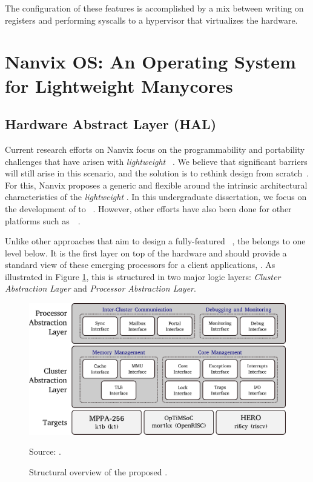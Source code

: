 	The configuration of these features is accomplished by a mix between
	writing on \dma registers and performing syscalls to a hypervisor
	that virtualizes the \mppa hardware.

\section{Nanvix OS: An Operating System for Lightweight Manycores}
\label{sec.nanvix}


	\subsection{Hardware Abstract Layer (HAL)}
	\label{sec.hal}

		Current research efforts on Nanvix focus on the programmability and portability
		challenges that have arisen with \textit{lightweight \manycores}~\cite{christgau2017, gamell2012, serres2011}.
		We believe that significant barriers will still arise in this scenario, and the solution is to rethink \os design from
		scratch~\cite{penna:compas19, penna2019}. For this, Nanvix proposes a generic and flexible \hal around the
		intrinsic architectural characteristics of the \textit{lightweight \manycores}. In this undergraduate dissertation, we 
		focus on the development of \hal to \mppa~\cite{DeDinechin2013-1}. However, other efforts have also been
		done for other platforms such as~\optimsoc~\cite{Wallentowitz2013}.

		Unlike other approaches that aim to design a fully-featured \os~\cite{Baumann2009,kluge2014,nightingale2009,rhoden2011},
		the \hal belongs to one level below.
		It is the first layer on top of the hardware and should provide a standard
		view of these emerging processors for a client applications, \eg \os.
		As illustrated in Figure \ref{fig.hal-struct}, this \hal is structured in
		two major logic layers: \textit{Cluster Abstraction Layer} and \textit{Processor Abstraction Layer}.

		\begin{figure}[t]
			\centering
			\caption{Structural overview of the proposed \hal.}

			\includegraphics[width=.9\textwidth]{images/hal-struct.pdf}

			Source: \cite{penna:compas19}.

		\label{fig.hal-struct}
		\end{figure}

